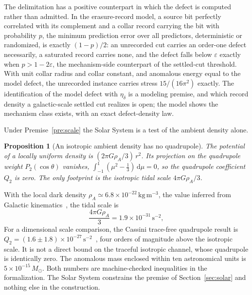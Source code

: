 \documentclass[11pt]{article}
\newcommand{\dd}{\,\mathrm d}
\newtheorem{proposition}[theorem]{Proposition}
\begin{document}
The delimitation has a positive counterpart in which the defect is computed
rather than admitted. In the erasure-record model, a source bit perfectly
correlated with its complement and a collar record carrying the bit with
probability \(p\), the minimum prediction error over all predictors,
deterministic or randomized, is exactly \((1-p)/2\): an unrecorded cut
carries an order-one defect necessarily, a saturated record carries none,
and the defect falls below \(\varepsilon\) exactly when
\(p>1-2\varepsilon\), the mechanism-side counterpart of the settled-cut
threshold. With unit collar radius and collar constant, and anomalous energy
equal to the model defect, the unrecorded instance carries stress
\(15/(16\pi^2)\) exactly. The identification of the model
defect with \(\eta_\delta\) is a modeling premise, and which record density
a galactic-scale settled cut realizes is open; the model shows the
mechanism class exists, with an exact defect-density law.

Under Premise~\ref{pre:scale} the Solar System is a test of the ambient
density alone.

\begin{proposition}[An isotropic ambient density has no quadrupole]
\label{prop:isotropic}
The potential of a locally uniform density is \((2\pi G\rho_A/3)\,r^2\). Its
projection on the quadrupole weight \(P_2(\cos\theta)\) vanishes,
\(\int_{-1}^{1}(\mu^2-\tfrac13)\dd\mu=0\), so the quadrupole coefficient
\(Q_2\) is zero. The only footprint is the isotropic tidal scale
\(4\pi G\rho_A/3\).
\end{proposition}

With the local dark density
\(\rho_A\simeq6.8\times10^{-22}\,\mathrm{kg\,m^{-3}}\), the value inferred
from Galactic kinematics~\cite{desalas2021}, the tidal scale is
\begin{equation}
\frac{4\pi G\rho_A}{3}=1.9\times10^{-31}\,\mathrm{s^{-2}},
\label{eq:tidal}
\end{equation}
For a dimensional scale comparison, the Cassini trace-free quadrupole result
is \(Q_2=(1.6\pm1.8)\times10^{-27}\,\mathrm{s^{-2}}\)~\cite{park2026}, four
orders of magnitude above the isotropic scale. It is not a direct bound on
the traceful isotropic channel, whose quadrupole is identically zero. The
anomalous mass enclosed within ten astronomical units is
\(5\times10^{-15}\,M_\odot\). Both numbers are machine-checked inequalities
in the formalization. The Solar System constrains the premise of
Section~\ref{sec:solar} and nothing else in the construction.
\end{document}
